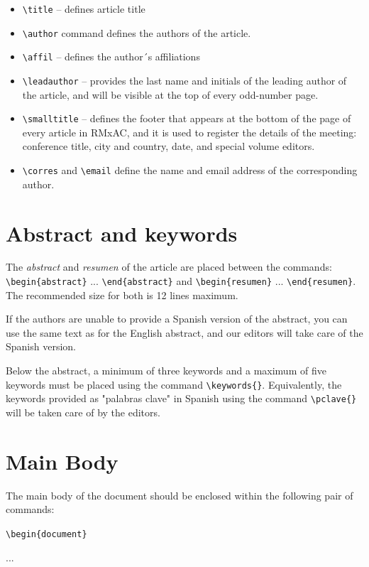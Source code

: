 \documentclass[11pt,proc,twoside]{RMxAC_rho-class/RMxAC_rho}
\newcommand{\CS}[1]{\texttt{\textbackslash #1}}
\begin{document}
\begin{itemize}
    \item \CS{title} -- defines article title
    \item \CS{author} command defines the authors of the article.
    \item \CS{affil} -- defines the author´s affiliations
    \item \CS{leadauthor} -- provides the last name and initials of the leading author of the article, and will be visible at the top of every odd-number page.
    \item \CS{smalltitle} -- defines the footer that appears at the bottom of the page of every article in RMxAC, and it is used to register the details of the meeting: conference title, city and country, date, and special volume editors.
    \item \CS{corres} and \CS{email} define the name and email address of the corresponding author.
\end{itemize}



\section{Abstract and keywords}

The {\it abstract} and {\it resumen} of the article are placed between the commands: \CS{begin}\verb|{abstract}| ... \CS{end}\verb|{abstract}| and \CS{begin}\verb|{resumen}| ... \CS{end}\verb|{resumen}|. The recommended size for both is 12 lines maximum.

If the authors are unable to provide a Spanish version of the abstract, you can use the same text as for the English abstract, and our editors will take care of the Spanish version.
 

Below the abstract, a minimum of three keywords and a maximum of five keywords must be placed using the command \verb|\keywords{}|. Equivalently, the keywords provided as "palabras clave" in Spanish using the command \verb|\pclave{}| will be taken care of by the editors.

\section{Main Body}

The main body of the document should be enclosed within the following pair of commands:

\bigskip
\CS{begin}\verb+{document}+

...
\end{document}
